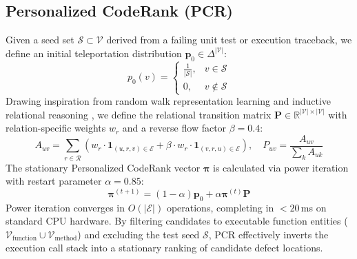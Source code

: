 \documentclass[11pt,a4paper]{article}
\begin{document}
\subsection{Personalized CodeRank (PCR)}
Given a seed set $\mathcal{S} \subset \mathcal{V}$ derived from a failing unit test or execution traceback, we define an initial teleportation distribution $\mathbf{p}_0 \in \Delta^{|\mathcal{V}|}$:
\begin{equation}
p_0(v) = \begin{cases} \frac{1}{|\mathcal{S}|}, & v \in \mathcal{S} \\ 0, & v \notin \mathcal{S} \end{cases}
\end{equation}
Drawing inspiration from random walk representation learning \cite{perozzi2014deepwalk,perozzi2017walklets} and inductive relational reasoning \cite{galkin2023towards}, we define the relational transition matrix $\mathbf{P} \in \mathbb{R}^{|\mathcal{V}| \times |\mathcal{V}|}$ with relation-specific weights $w_r$ and a reverse flow factor $\beta = 0.4$:
\begin{equation}
A_{uv} = \sum_{r \in \mathcal{R}} \left( w_r \cdot \mathbf{1}_{(u, r, v) \in \mathcal{E}} + \beta \cdot w_r \cdot \mathbf{1}_{(v, r, u) \in \mathcal{E}} \right), \quad P_{uv} = \frac{A_{uv}}{\sum_k A_{uk}}
\end{equation}
The stationary Personalized CodeRank vector $\mathbf{\pi}$ is calculated via power iteration with restart parameter $\alpha = 0.85$:
\begin{equation}
\mathbf{\pi}^{(t+1)} = (1 - \alpha) \mathbf{p}_0 + \alpha \mathbf{\pi}^{(t)} \mathbf{P}
\end{equation}
Power iteration converges in $O(|\mathcal{E}|)$ operations, completing in $<20$\,ms on standard CPU hardware. By filtering candidates to executable function entities ($\mathcal{V}_{\text{function}} \cup \mathcal{V}_{\text{method}}$) and excluding the test seed $\mathcal{S}$, PCR effectively inverts the execution call stack into a stationary ranking of candidate defect locations.
\end{document}

